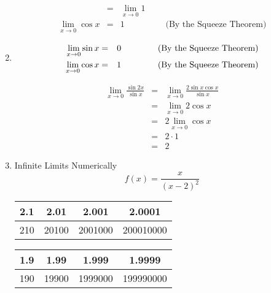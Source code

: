 \documentclass{article}
\begin{document}
\begin{enumerate}
\begin{eqnarray}
    	    &=& \lim_{x \to 0}{1} \\
    	    \lim_{x \to 0}{\cos{x}} &=& 1 \hspace{2cm} \text{(By the Squeeze Theorem)}
    	\end{eqnarray}
    \item
    	\begin{eqnarray}
    	    \lim_{x \to 0}{\sin{x}} &=& 0 \hspace{1.5cm} \text{(By the Squeeze Theorem)} \\
    	    \lim_{x \to 0}{\cos{x}} &=& 1 \hspace{1.5cm} \text{(By the Squeeze Theorem)}
    	\end{eqnarray}
    
    	\begin{eqnarray}
    	    \lim_{x \to 0}{\frac{\sin{2x}}{\sin{x}}} &=& \lim_{x \to 0}{\frac{2 \sin{x} \cos{x}}{\sin{x}}} \\
    	    &=& \lim_{x \to 0}{2 \cos{x}} \\
    	    &=& 2 \lim_{x \to 0}{\cos{x}} \\
    	    &=& 2 \cdot 1 \\
    	    &=& 2
    	\end{eqnarray}
	\item Infinite Limits Numerically
		$$f(x) = \frac{x}{(x-2)^2}$$
		\begin{tabular}{| c | c | c | c |}
			\hline
			2.1 & 2.01 & 2.001 & 2.0001 \\
			\hline
			210 & 20100 & 2001000 & 200010000 \\
			\hline
		\end{tabular}

		\begin{tabular}{| c | c | c | c |}
			\hline
			1.9 & 1.99 & 1.999 & 1.9999 \\
			\hline
			190 & 19900 & 1999000 & 199990000 \\
			\hline
		\end{tabular}


\end{enumerate}
\end{document}
